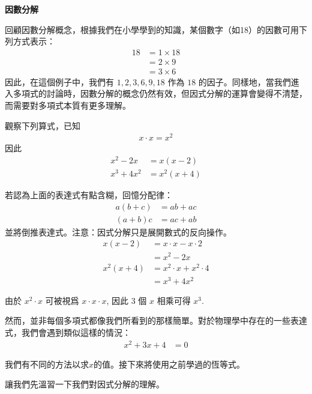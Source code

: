 \documentclass[12pt]{article}
\begin{document}
    \pagestyle{fancy}
    \begin{center}
        \textbf{因數分解}
    \end{center}

    回顧因數分解概念，根據我們在小學學到的知識，某個數字（如18）的因數可用下列方式表示： \begin{align*}
        18&=1\times 18\\
        &=2\times 9\\
        &=3\times 6
    \end{align*}
    因此，在這個例子中，我們有 $1,2,3,6,9,18$ 作為 $18$ 的因子。同樣地，當我們進入多項式的討論時，因數分解的概念仍然有效，但因式分解的運算會變得不清楚，而需要對多項式本質有更多理解。

    觀察下列算式，已知 \begin{align*}
        x\cdot x=x^2
    \end{align*} 因此\begin{align*}
        x^2-2x&=x(x-2)\\
        x^3+4x^2&=x^2(x+4)
    \end{align*}

    若認為上面的表達式有點含糊，回憶分配律：\begin{align*}
        a(b+c)&=ab+ac\\
        (a+b)c&=ac+ab
    \end{align*} 並將倒推表達式。注意：因式分解只是展開數式的反向操作。\begin{align*}
        x(x-2)&=x\cdot x-x\cdot 2\\
        &=x^2-2x\\
        x^2(x+4)&=x^2\cdot x+x^2\cdot 4\\
        &=x^3+4x^2
    \end{align*}

    由於 $x^2\cdot x$ 可被視爲 $x\cdot x\cdot x$, 因此 3 個 $x$ 相乘可得 $x^3$.

    然而，並非每個多項式都像我們所看到的那樣簡單。對於物理學中存在的一些表達式，我們會遇到類似這樣的情況：\begin{align*}
        x^2+3x+4&=0
    \end{align*}

    我們有不同的方法以求$x$的值。接下來將使用之前學過的恆等式。

    讓我們先溫習一下我們對因式分解的理解。
\end{document}
